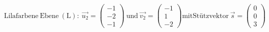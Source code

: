 \documentclass[preview]{standalone}
\begin{document}
\begin{center}
$\mathrm{Lilafarbene \: Ebene \: (L):} \: \vec{u_2} = \begin{pmatrix} -1 \\ -2 \\ -1 \end{pmatrix} \: \mathrm{und} \: \vec{v_2} = \begin{pmatrix} -1 \\ 1 \\ -2 \end{pmatrix} \mathrm{mit Stützvektor \:} \vec{s} = \begin{pmatrix} 0 \\ 0 \\ 3 \end{pmatrix}$
\end{center}
\end{document}
